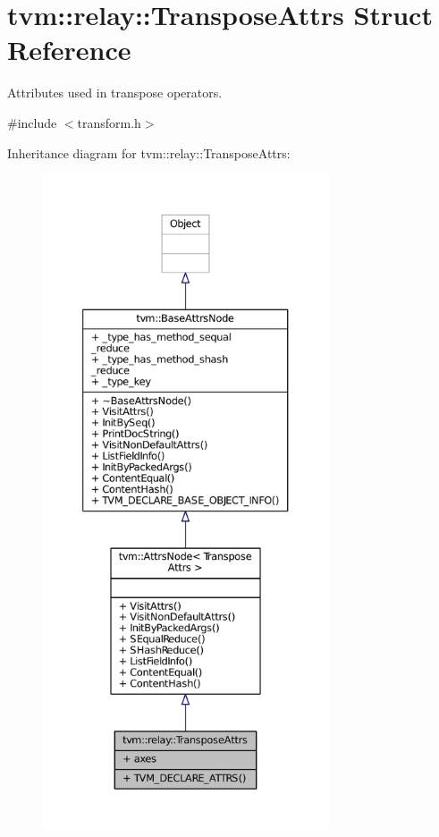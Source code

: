 \hypertarget{structtvm_1_1relay_1_1TransposeAttrs}{}\section{tvm\+:\+:relay\+:\+:Transpose\+Attrs Struct Reference}
\label{structtvm_1_1relay_1_1TransposeAttrs}


Attributes used in transpose operators.  




{\ttfamily \#include $<$transform.\+h$>$}



Inheritance diagram for tvm\+:\+:relay\+:\+:Transpose\+Attrs\+:
\nopagebreak
\begin{figure}[H]
\begin{center}
\leavevmode
\includegraphics[height=550pt]{structtvm_1_1relay_1_1TransposeAttrs__inherit__graph}
\end{center}
\end{figure}



